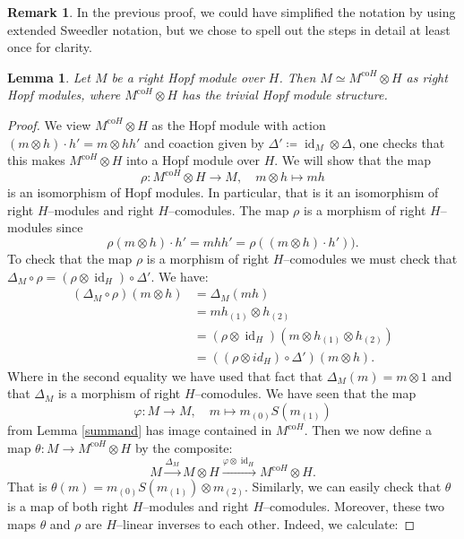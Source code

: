 \documentclass{article}
\theoremstyle{plain}
\newtheorem{Lemma}[Th]{Lemma}
\theoremstyle{definition}
\newtheorem{Rem}[Th]{Remark}
\DeclareMathOperator{\id}{id}
\begin{document}
 \begin{Rem}
     In the previous proof, we could have simplified the notation by using extended Sweedler notation, 
     but we chose to spell out the steps in detail at least once for clarity.
 \end{Rem}

\begin{Lemma}\label{tensor identity}
    Let $M$ be a right Hopf module over $H$. Then $M\simeq M^{\text{co}H}\otimes H$ as right Hopf modules, where $ M^{\text{co}H}\otimes H$ has the trivial Hopf module structure.
\end{Lemma} 

\begin{proof}
    We view $M^{\text{co}H}\otimes H$ as the Hopf module with action $(m\otimes h)\cdot h'=m\otimes hh'$ and coaction given by $\Delta'\coloneqq\id_M\otimes \Delta$, one checks that this makes $M^{\text{co}H}\otimes H$ into a Hopf module over $H$. We will show that the map
    \[
    \rho\colon M^{\text{co}H}\otimes H\to M, \quad m\otimes h\mapsto mh
    \]
    is an isomorphism of Hopf modules. In particular, that is it an isomorphism of right $H$--modules and right $H$--comodules. The map $\rho$ is a morphism of right $H$--modules since 
    \[
    \rho(m\otimes h) \cdot h'=mhh'= \rho((m\otimes h)\cdot h')).
    \]
    To check that the map $\rho$ is a morphism of right $H$--comodules we must check that $\Delta_M\circ \rho=(\rho\otimes \id_H)\circ\Delta'$. We have:
    \begin{align*}
        (\Delta_M\circ \rho) (m\otimes h) &= \Delta_M(mh) \\
        &= mh_{(1)} \otimes h_{(2)} \\
        &=(\rho \otimes 
        \id_H)(  m 
        \otimes h_{(1)} \otimes h_{(2)}) \\
        &=((\rho \otimes 
        id_H) \circ \Delta')(m\otimes h).
    \end{align*}
    Where in the second equality we have used that fact that $\Delta_M(m)=m\otimes 1$ and that $\Delta_M$ is a morphism of right $H$--comodules. We have seen that the map 
    \[
    \varphi\colon M\to M, \quad m\mapsto m_{(0)}S(m_{(1)})
    \]
    from  Lemma \ref{summand} has image contained in $M^{\text{co}H}$. Then we now define a map $\theta\colon M\to M^{\text{co}H}\otimes H$ by the composite: 
    \[
    M\xrightarrow{\Delta_M}{} M\otimes H \xrightarrow{\varphi \otimes \id_H}{} M^{\text{co}H}\otimes H.
    \]
    That is $\theta(m)=m_{(0)}S(m_{(1)})\otimes m_{(2)}$. Similarly, we can easily check that $\theta$ is a map of both right $H$--modules and right $H$--comodules. Moreover, these two maps $\theta$ and $\rho$ are $H$--linear inverses to each other. Indeed,  we calculate: 

\end{proof}
\end{document}
